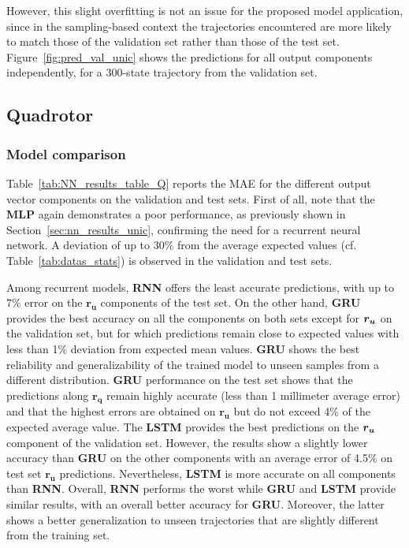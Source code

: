 However, this slight overfitting is not an issue for the proposed model application, since in the sampling-based context the trajectories encountered are more likely to match those of the validation set rather than those of the test set.
Figure~\ref{fig:pred_val_unic} shows the predictions for all output components independently, for a 300-state trajectory from the validation set.

\subsection{Quadrotor}\label{sec:nn_results_quad}

\subsubsection{Model comparison}\label{sec:nn_comparaison_quad}



Table~\ref{tab:NN_results_table_Q} reports the MAE for the different output vector components on the validation and test sets. 
First of all, note that the \textbf{MLP} again demonstrates a poor performance, as previously shown in Section~\ref{sec:nn_results_unic}, confirming the need for a recurrent neural network.
A deviation of up to 30\% from the average expected values (cf. Table~\ref{tab:datas_stats}) is observed in the validation and test sets.

Among recurrent models, \textbf{RNN} offers the least accurate predictions, with up to 7\% error on the $\boldsymbol{r_u}$ components of the test set.
On the other hand, \textbf{GRU} provides the best accuracy on all the components on both sets except for $\boldsymbol{r_u}$ on the validation set, but for which predictions remain close to expected values with less than 1\% deviation from expected mean values.
\textbf{GRU} shows the best reliability and generalizability of the trained model to unseen samples from a different distribution.
\textbf{GRU} performance on the test set shows that the predictions along $\boldsymbol{r_q}$ remain highly accurate (less than 1 millimeter average error) and that the highest errors are obtained on $\boldsymbol{r_u}$ but do not exceed 4\% of the expected average value.
The \textbf{LSTM} provides the best predictions on the $\boldsymbol{r_u}$ component of the validation set. 
However, the results show a slightly lower accuracy than \textbf{GRU} on the other components with an average error of 4.5\% on test set $\boldsymbol{r_u}$ predictions.
Nevertheless, \textbf{LSTM} is more accurate on all components than \textbf{RNN}.
Overall, \textbf{RNN} performs the worst while \textbf{GRU} and \textbf{LSTM} provide similar results, with an overall better accuracy for \textbf{GRU}.
Moreover, the latter shows a better generalization to unseen trajectories that are slightly different from the training set.

